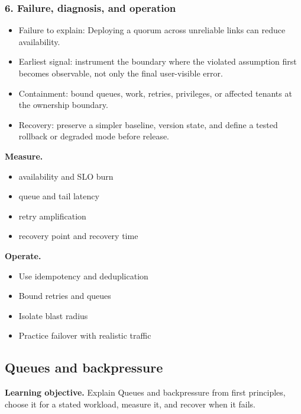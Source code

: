 \subsubsection*{6. Failure, diagnosis, and operation}
\begin{itemize}
\item Failure to explain: Deploying a quorum across unreliable links can reduce availability.
\item Earliest signal: instrument the boundary where the violated assumption first becomes observable, not only the final user-visible error.
\item Containment: bound queues, work, retries, privileges, or affected tenants at the ownership boundary.
\item Recovery: preserve a simpler baseline, version state, and define a tested rollback or degraded mode before release.
\end{itemize}
\textbf{Measure.}\begin{itemize}
\item availability and SLO burn
\item queue and tail latency
\item retry amplification
\item recovery point and recovery time
\end{itemize}
\textbf{Operate.}\begin{itemize}
\item Use idempotency and deduplication
\item Bound retries and queues
\item Isolate blast radius
\item Practice failover with realistic traffic
\end{itemize}
\subsection{Queues and backpressure}
\textbf{Learning objective.} Explain Queues and backpressure from first principles, choose it for a stated workload, measure it, and recover when it fails.
